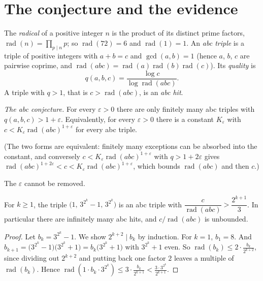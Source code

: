 \section{The conjecture and the evidence}

The \emph{radical} of a positive integer $n$ is the product of its distinct prime factors, $\operatorname{rad}(n)=\prod_{p\mid n}p$; so $\operatorname{rad}(72)=6$
and $\operatorname{rad}(1)=1$. An \emph{abc triple} is a triple of positive integers with $a+b=c$ and $\gcd(a,b)=1$ (hence $a$, $b$, $c$ are pairwise
coprime, and $\operatorname{rad}(abc)=\operatorname{rad}(a)\operatorname{rad}(b)\operatorname{rad}(c)$). Its \emph{quality} is
\[
q(a,b,c)=\frac{\log c}{\log\operatorname{rad}(abc)}.
\]
A triple with $q>1$, that is $c>\operatorname{rad}(abc)$, is an \emph{abc hit}.

\begin{center}
\emph{The abc conjecture.} For every $\varepsilon>0$ there are only finitely many abc triples with $q(a,b,c)>1+\varepsilon$. Equivalently, for every
$\varepsilon>0$ there is a constant $K_\varepsilon$ with $c<K_\varepsilon\operatorname{rad}(abc)^{1+\varepsilon}$ for every abc triple.
\end{center}

(The two forms are equivalent: finitely many exceptions can be absorbed into the constant, and conversely $c<K_\varepsilon\operatorname{rad}(abc)^{1+\varepsilon}$
with $q>1+2\varepsilon$ gives $\operatorname{rad}(abc)^{1+2\varepsilon}<c<K_\varepsilon\operatorname{rad}(abc)^{1+\varepsilon}$, which bounds
$\operatorname{rad}(abc)$ and then $c$.)

The $\varepsilon$ cannot be removed.

\begin{proposition}\label{prop:abcinf}
For $k\ge1$, the triple $\bigl(1,\,3^{2^k}-1,\,3^{2^k}\bigr)$ is an abc triple with $\dfrac c{\operatorname{rad}(abc)}>\dfrac{2^{k+1}}3$. In particular there are
infinitely many abc hits, and $c/\operatorname{rad}(abc)$ is unbounded.
\end{proposition}
\begin{proof}
Let $b_k=3^{2^k}-1$. We show $2^{k+2}\mid b_k$ by induction. For $k=1$, $b_1=8$. And $b_{k+1}=\bigl(3^{2^k}-1\bigr)\bigl(3^{2^k}+1\bigr)=b_k\bigl(3^{2^k}+1\bigr)$ with
$3^{2^k}+1$ even. So $\operatorname{rad}(b_k)\le2\cdot\frac{b_k}{2^{k+2}}$, since dividing out $2^{k+2}$ and putting back one factor $2$ leaves a multiple of
$\operatorname{rad}(b_k)$. Hence $\operatorname{rad}(1\cdot b_k\cdot3^{2^k})\le3\cdot\frac{b_k}{2^{k+1}}<\frac{3\cdot3^{2^k}}{2^{k+1}}$.
\end{proof}

